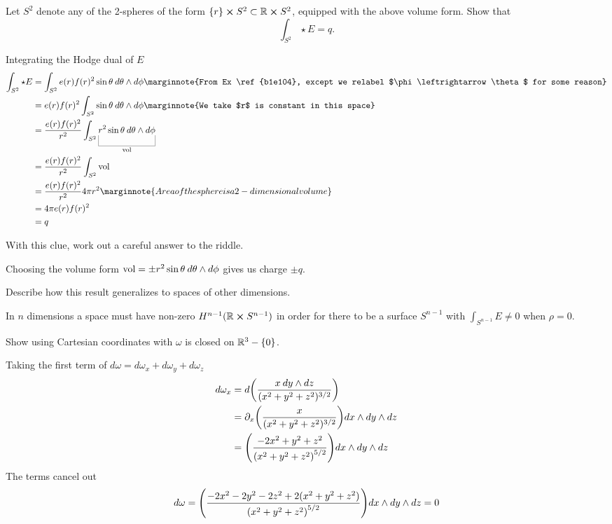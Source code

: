 \documentclass[10pt]{article}
\begin{document}
\begin{example}
	Let $S^2$ denote any of the 2-spheres of the form $\lbrace r\rbrace \cross S^2 \subset \mathbb{R} \cross S^2$, equipped with the above volume form. Show that
	$$
		\int_{S^2} \star E = q.
	$$
\end{example}
\sol Integrating the Hodge dual of $E$
$$
\begin{aligned}
	\int_{S^2} \star E &= \int_{S^2} e(r) f(r)^2 \sin\theta\:d\theta \wedge d\phi\marginnote{From Ex \ref{b1e104}, except we relabel $\phi \leftrightarrow \theta$ for some reason}\\
	&= e(r) f(r)^2 \int_{S^2} \sin\theta\:d\theta \wedge d\phi\marginnote{We take $r$ is constant in this space}\\
	&= \frac{e(r) f(r)^2}{r^2} \int_{S^2} \ub{r^2\sin\theta\:d\theta \wedge d\phi}{\vol}\\
	&= \frac{e(r) f(r)^2}{r^2} \int_{S^2} \vol\\
	&= \frac{e(r) f(r)^2}{r^2} 4\pi r^2\marginnote{Area of the sphere is a 2-dimensional volume}\\
	&= 4\pi e(r) f(r)^2\\
	&= q
\end{aligned}
$$


\begin{example}
	With this clue, work out a careful answer to the riddle.
\end{example}
\sol Choosing the volume form $\text{vol} = \pm r^2\sin\theta\:d\theta \wedge d\phi$ gives us charge $\pm q$.


\begin{example}
	Describe how this result generalizes to spaces of other dimensions.
\end{example}
\sol In $n$ dimensions a space must have non-zero $H^{n-1}(\mathbb{R} \cross S^{n-1})$ in order for there to be a surface $S^{n-1}$ with $\int_{S^{n-1}} E \ne 0$ when $\rho = 0$.


\begin{example}
	Show using Cartesian coordinates with $\omega$ is closed on $\mathbb{R}^3 - \lbrace0\rbrace$.
\end{example}
\sol Taking the first term of $d\omega = d\omega_x + d\omega_y + d\omega_z$
$$
\begin{aligned}
	d\omega_x &= d\p*{\frac{x\:dy\wedge dz}{(x^2+y^2+z^2)^{3/2}}}\\
	&= \partial_x\p*{\frac{x}{(x^2+y^2+z^2)^{3/2}}}dx\wedge dy\wedge dz\\
	&= \p*{\frac{-2 x^2+y^2+z^2}{\left(x^2+y^2+z^2\right)^{5/2}}}dx\wedge dy\wedge dz\\
\end{aligned}
$$
The terms cancel out
$$
d\omega = \p*{\frac{-2x^2-2y^2-2z^2+2 (x^2+y^2+z^2)}{\left(x^2+y^2+z^2\right)^{5/2}}}dx\wedge dy\wedge dz = 0
$$
\end{document}
